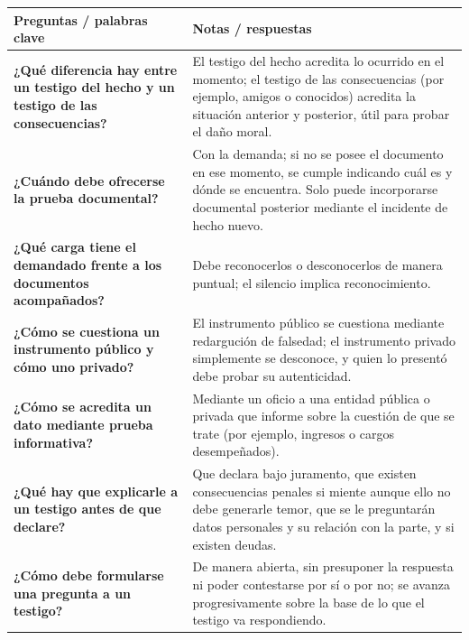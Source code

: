\documentclass[12pt,oneside]{book}
\begin{document}
\begin{table}[H]
\centering
\begin{tabularx}{\textwidth}{
    >{\raggedright\arraybackslash}p{}
    >{\raggedright\arraybackslash}X
}
\toprule
\textbf{Preguntas / palabras clave} & \textbf{Notas / respuestas} \\
\midrule

\textbf{¿Qué diferencia hay entre un testigo del hecho y un testigo de las consecuencias?} &
El testigo del hecho acredita lo ocurrido en el momento; el testigo de las consecuencias (por ejemplo, amigos o conocidos) acredita la situación anterior y posterior, útil para probar el daño moral. \\

\textbf{¿Cuándo debe ofrecerse la prueba documental?} &
Con la demanda; si no se posee el documento en ese momento, se cumple indicando cuál es y dónde se encuentra. Solo puede incorporarse documental posterior mediante el incidente de hecho nuevo. \\

\textbf{¿Qué carga tiene el demandado frente a los documentos acompañados?} &
Debe reconocerlos o desconocerlos de manera puntual; el silencio implica reconocimiento. \\

\textbf{¿Cómo se cuestiona un instrumento público y cómo uno privado?} &
El instrumento público se cuestiona mediante redargución de falsedad; el instrumento privado simplemente se desconoce, y quien lo presentó debe probar su autenticidad. \\

\textbf{¿Cómo se acredita un dato mediante prueba informativa?} &
Mediante un oficio a una entidad pública o privada que informe sobre la cuestión de que se trate (por ejemplo, ingresos o cargos desempeñados). \\

\textbf{¿Qué hay que explicarle a un testigo antes de que declare?} &
Que declara bajo juramento, que existen consecuencias penales si miente aunque ello no debe generarle temor, que se le preguntarán datos personales y su relación con la parte, y si existen deudas. \\

\textbf{¿Cómo debe formularse una pregunta a un testigo?} &
De manera abierta, sin presuponer la respuesta ni poder contestarse por sí o por no; se avanza progresivamente sobre la base de lo que el testigo va respondiendo. \\


\end{tabularx}
\end{table}
\end{document}
